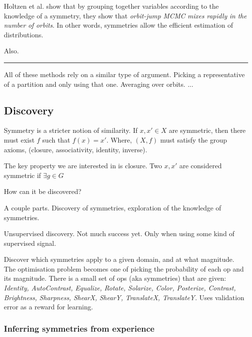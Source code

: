 Holtzen et al. \cite{Holtzen2019} show that by grouping together variables according to
the knowledge of a symmetry, they show that \textit{orbit-jump MCMC mixes rapidly in the number of orbits}.
In other words, symmetries allow the efficient estimation of distributions.

Also. \cite{Campbell2019}

\begin{center}\rule{0.5\linewidth}{\linethickness}\end{center}

All of these methods rely on a similar type of argument. Picking a representative
of a partition and only using that one. Averaging over orbits. ...

\subsection{Discovery}


Symmetry is a stricter notion of similarity.
If $x, x' \in X$ are symmetric, then there must exist $f$ such that $f(x) = x'$.
Where, $(X, f)$ must satisfy the group axioms, (closure, associativity, identity, inverse).

The key property we are interested in is closure.
Two $x, x'$ are considered symmetric if $\exists g\in G$


How can it be discovered?

A couple parts. Discovery of symmetries, exploration of the knowledge of symmetries.

Unsupervised discovery. Not much success yet. Only when using some kind of supervised signal.

\cite{Ho2019a, Lim2019, Cubuk2018, Cubuk2019}
Discover which symmetries apply to a given domain, and at what magnitude.
The optimisation problem becomes one of picking the probability of each op and its magnitude.
There is a small set of ops (aka symmetries) that are given:
\textit{Identity, AutoContrast, Equalize, Rotate, Solarize, Color, Posterize, Contrast,
	Brightness, Sharpness, ShearX, ShearY, TranslateX, TranslateY.}
Uses validation error as a reward for learning.

\subsubsection{Inferring symmetries from experience}

